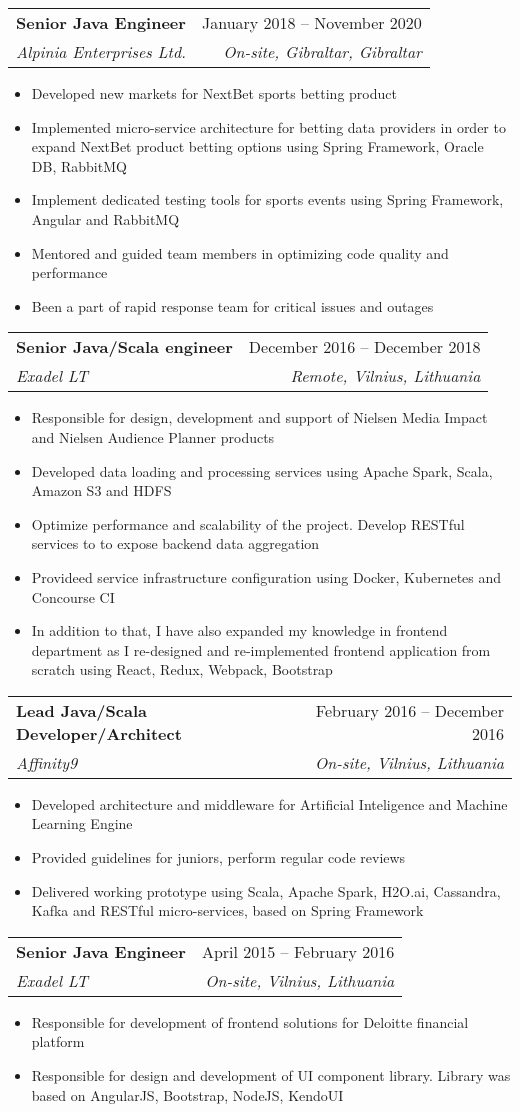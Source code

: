 \documentclass[11pt, letterpaper]{article}
\makeatletter
\newcommand{\resumeItem}[1]{
  \item\small{
    {#1 \vspace{-2pt}}
  }
}
\newcommand{\resumeSubheading}[4]{
  \vspace{-2pt}\item
    \begin{tabular*}{0.97\textwidth}[t]{l@{\extracolsep{\fill}}r}
      \textbf{#1} & #2 \\
      \textit{\small#3} & \textit{\small #4} \\
    \end{tabular*}\vspace{-7pt}
}
\newcommand{\resumeItemListStart}{\begin{itemize}}
\newcommand{\resumeItemListEnd}{\end{itemize}\vspace{-5pt}}
\makeatother
\begin{document}
    \resumeSubheading
      {Senior Java Engineer}{January 2018 -- November 2020}
      {Alpinia Enterprises Ltd.}{On-site, Gibraltar, Gibraltar}
      \resumeItemListStart
        \resumeItem{Developed new markets for NextBet sports betting product}
        \resumeItem{Implemented micro-service architecture for betting data providers in order to expand NextBet product betting options using Spring Framework, Oracle DB, RabbitMQ}
        \resumeItem{Implement dedicated testing tools for sports events using Spring Framework, Angular and RabbitMQ}
        \resumeItem{Mentored and guided team members in optimizing code quality and performance}
        \resumeItem{Been a part of rapid response team for critical issues and outages}
      \resumeItemListEnd
      
    \resumeSubheading
      {Senior Java/Scala engineer}{December 2016 -- December 2018}
      {Exadel LT}{Remote, Vilnius, Lithuania}
      \resumeItemListStart
        \resumeItem{Responsible for design, development and support of Nielsen Media Impact and Nielsen Audience Planner products}
        \resumeItem{Developed data loading and processing services using Apache Spark, Scala, Amazon S3 and HDFS}
        \resumeItem{Optimize performance and scalability of the project. Develop RESTful services to to expose backend data aggregation}
        \resumeItem{Provideed service infrastructure configuration using Docker, Kubernetes and Concourse CI}
        \resumeItem{In addition to that, I have also expanded my knowledge in frontend department as I re-designed and re-implemented frontend application from scratch using React, Redux, Webpack, Bootstrap}
      \resumeItemListEnd

    \resumeSubheading
      {Lead Java/Scala Developer/Architect}{February 2016 -- December 2016}
      {Affinity9}{On-site, Vilnius, Lithuania}
      \resumeItemListStart
        \resumeItem{Developed architecture and middleware for Artificial Inteligence and Machine
Learning Engine}
        \resumeItem{Provided guidelines for juniors, perform regular code reviews}
        \resumeItem{Delivered working prototype using Scala, Apache Spark, H2O.ai, Cassandra, Kafka and RESTful micro-services, based on Spring Framework}
      \resumeItemListEnd

    \resumeSubheading
      {Senior Java Engineer}{April 2015 -- February 2016}
      {Exadel LT}{On-site, Vilnius, Lithuania}
      \resumeItemListStart
        \resumeItem{Responsible for development of frontend solutions for Deloitte financial platform}
        \resumeItem{Responsible for design and development of UI component library. Library was based on AngularJS, Bootstrap, NodeJS, KendoUI}
      \resumeItemListEnd
\end{document}
